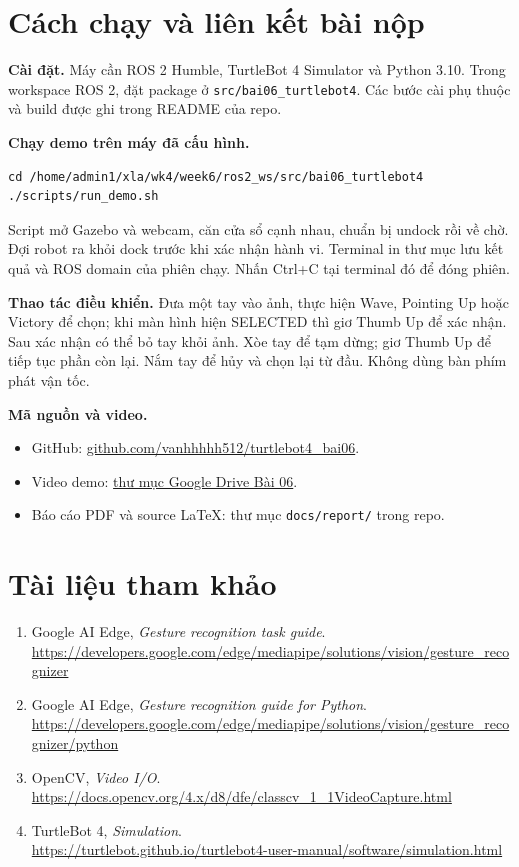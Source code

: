 \documentclass[a4paper,11pt]{article}
\newcommand{\code}[1]{\nolinkurl{#1}}
\newcommand{\github}{https://github.com/vanhhhhh512/turtlebot4_bai06}
\newcommand{\drive}{https://drive.google.com/drive/folders/1FdF8vADL3xgHH5QPhekMk_7wn1XFR4Jp?usp=drive_link}
\begin{document}
\section{Cách chạy và liên kết bài nộp}
\textbf{Cài đặt.} Máy cần ROS 2 Humble, TurtleBot 4 Simulator và Python 3.10.
Trong workspace ROS 2, đặt package ở \code{src/bai06_turtlebot4}.
Các bước cài phụ thuộc và build được ghi trong README của repo.

\textbf{Chạy demo trên máy đã cấu hình.}
\begin{Verbatim}
cd /home/admin1/xla/wk4/week6/ros2_ws/src/bai06_turtlebot4
./scripts/run_demo.sh
\end{Verbatim}
Script mở Gazebo và webcam, căn cửa sổ cạnh nhau, chuẩn bị undock rồi về chờ.
Đợi robot ra khỏi dock trước khi xác nhận hành vi. Terminal in thư mục lưu kết quả
và ROS domain của phiên chạy. Nhấn Ctrl+C tại terminal đó để đóng phiên.

\textbf{Thao tác điều khiển.} Đưa một tay vào ảnh, thực hiện Wave, Pointing Up
hoặc Victory để chọn; khi màn hình hiện SELECTED thì giơ Thumb Up để xác nhận.
Sau xác nhận có thể bỏ tay khỏi ảnh. Xòe tay để tạm dừng; giơ Thumb Up để tiếp tục
phần còn lại. Nắm tay để hủy và chọn lại từ đầu. Không dùng bàn phím phát vận tốc.

\textbf{Mã nguồn và video.}
\begin{itemize}
\item GitHub: \href{\github}{github.com/vanhhhhh512/turtlebot4\_bai06}.
\item Video demo: \href{\drive}{thư mục Google Drive Bài 06}.
\item Báo cáo PDF và source LaTeX: thư mục \code{docs/report/} trong repo.
\end{itemize}

\section*{Tài liệu tham khảo}
\small
\begin{enumerate}
\item Google AI Edge, \textit{Gesture recognition task guide}.\\
\url{https://developers.google.com/edge/mediapipe/solutions/vision/gesture_recognizer}
\item Google AI Edge, \textit{Gesture recognition guide for Python}.\\
\url{https://developers.google.com/edge/mediapipe/solutions/vision/gesture_recognizer/python}
\item OpenCV, \textit{Video I/O}.\\
\url{https://docs.opencv.org/4.x/d8/dfe/classcv_1_1VideoCapture.html}
\item TurtleBot 4, \textit{Simulation}.\\
\url{https://turtlebot.github.io/turtlebot4-user-manual/software/simulation.html}
\end{enumerate}
\end{document}
